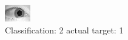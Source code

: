\begin{figure}[h!]
\begin{center}
\includegraphics[width=0.60\columnwidth]{figures/ID1446_class_2_target_1.png}
\end{center}
\caption{ Classification: 2 actual target: 1}
\label{fig:ID1446_class_2_target_1}
\end{figure}
